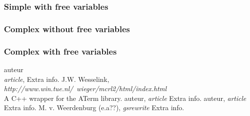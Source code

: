 \documentclass[a4paper,10pt]{article}
\theoremstyle{plain}
\theoremstyle{definition}
\begin{document}
\subsubsection{Simple with free variables}

\subsubsection{Complex without free variables}

\subsubsection{Complex with free variables}

\newpage
\begin{thebibliography}{99}   auteur\\
   \textit{article},
   Extra info.
   J.W. Wesselink,
   \textit{http://www.win.tue.nl/~wieger/mcrl2/html/index.html}\\
   A C++ wrapper for the ATerm library.
   auteur,
   \textit{article}
   Extra info.
   auteur,
   \textit{article}
   Extra info.
   M. v. Weerdenburg (e.a??),
   \textit{gsrewrite}
   Extra info.

\end{thebibliography}

\newpage
\end{document}
